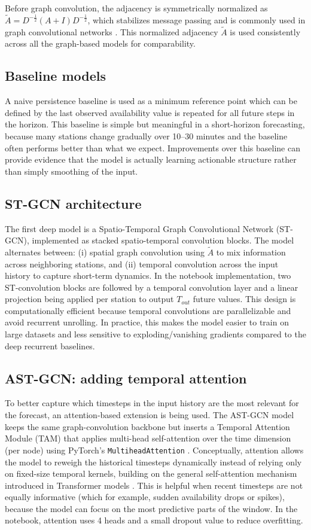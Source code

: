 \documentclass[11pt]{report}
\begin{document}
Before graph convolution, the adjacency is symmetrically normalized as
$\tilde{A} = D^{-\frac12}(A + I)D^{-\frac12}$, which stabilizes message passing and is commonly used in graph convolutional networks \cite{kipf2017gcn}. This normalized adjacency $\tilde{A}$ is used consistently across all the graph-based models for comparability.

\subsection{Baseline models}
A naive persistence baseline is used as a minimum reference point which can be defined by the last observed availability value is repeated for all future steps in the horizon. This baseline is simple but meaningful in a short-horizon forecasting, because many stations change gradually over 10--30 minutes and the baseline often performs better than what we expect. Improvements over this baseline can provide evidence that the model is actually learning actionable structure rather than simply smoothing  of the input.

\subsection{ST-GCN architecture}
The first deep model is a Spatio-Temporal Graph Convolutional Network (ST-GCN), implemented as stacked spatio-temporal convolution blocks. The model alternates between:
(i) spatial graph convolution using $\tilde{A}$ to mix information across neighboring stations, and
(ii) temporal convolution across the input history to capture short-term dynamics.
In the notebook implementation, two ST-convolution blocks are followed by a temporal convolution layer and a linear projection being applied per station to output $T_{out}$ future values. This design is computationally efficient because temporal convolutions are parallelizable and avoid recurrent unrolling. In practice, this makes the model easier to train on large datasets and less sensitive to exploding/vanishing gradients compared to the deep recurrent baselines.

\subsection{AST-GCN: adding temporal attention}
To better capture which timesteps in the input history are the most relevant for the forecast, an attention-based extension is being used. The AST-GCN model keeps the same graph-convolution backbone but inserts a Temporal Attention Module (TAM) that applies multi-head self-attention over the time dimension (per node) using PyTorch’s \texttt{MultiheadAttention} \cite{pytorch_mha}. Conceptually, attention allows the model to reweigh the historical timesteps dynamically instead of relying only on fixed-size temporal kernels, building on the general self-attention mechanism introduced in Transformer models \cite{vaswani2017attention}. This is helpful when recent timesteps are not equally informative (which for example, sudden availability drops or spikes), because the model can focus on the most predictive parts of the window. In the notebook, attention uses 4 heads and a small dropout value to reduce overfitting.
\end{document}

